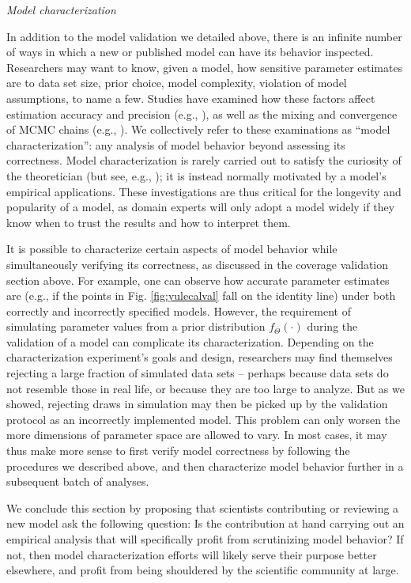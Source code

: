 \documentclass[oneside]{article}
\begin{document}
\vspace{.25cm}

\noindent \emph{Model characterization}

In addition to the model validation we detailed above, there is an infinite number of ways in which a new or published model can have its behavior inspected.
Researchers may want to know, given a model, how sensitive parameter estimates are to data set size, prior choice, model complexity, violation of model assumptions, to name a few.
Studies have examined how these factors affect estimation accuracy and precision (e.g., \citealp{zhang23,luo23}), as well as the mixing and convergence of MCMC chains (e.g., \citealp{nylander04,zhang23}).
We collectively refer to these examinations as ``model characterization'': any analysis of model behavior beyond assessing its correctness.
Model characterization is rarely carried out to satisfy the curiosity of the theoretician (but see, e.g., \citealp{tuffley97,steel20}); it is instead normally motivated by a model's empirical applications.
These investigations are thus critical for the longevity and popularity of a model, as domain experts will only adopt a model widely if they know when to trust the results and how to interpret them.

It is possible to characterize certain aspects of model behavior while simultaneously verifying its correctness, as discussed in the coverage validation section above.
For example, one can observe how accurate parameter estimates are (e.g., if the points in Fig. \ref{fig:yulecalval} fall on the identity line) under both correctly and incorrectly specified models.
However, the requirement of simulating parameter values from a prior distribution $f_{\Theta}(\cdot)$ during the validation of a model can complicate its characterization.
Depending on the characterization experiment's goals and design, researchers may find themselves rejecting a large fraction of simulated data sets -- perhaps because data sets do not resemble those in real life, or because they are too large to analyze.
But as we showed, rejecting draws in simulation may then be picked up by the validation protocol as an incorrectly implemented model.
This problem can only worsen the more dimensions of parameter space are allowed to vary.
In most cases, it may thus make more sense to first verify model correctness by following the procedures we described above, and then characterize model behavior further in a subsequent batch of analyses.

We conclude this section by proposing that scientists contributing or reviewing a new model ask the following question: Is the contribution at hand carrying out an empirical analysis that will specifically profit from scrutinizing model behavior?
If not, then model characterization efforts will likely serve their purpose better elsewhere, and profit from being shouldered by the scientific community at large.
\end{document}
